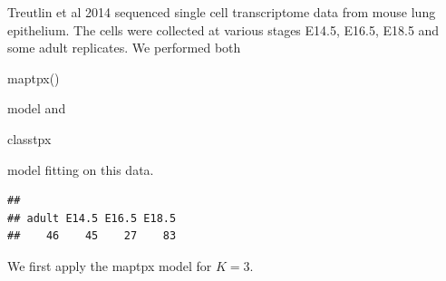 \documentclass[12pt]{article}
\begin{document}
Treutlin et al 2014 sequenced single cell transcriptome data from mouse lung epithelium. The cells were collected at various stages E14.5, E16.5, E18.5 and some adult replicates. We performed both \begin{verb} maptpx() \end{verb} model and \begin{verb} classtpx \end{verb} model fitting on this data.

\begin{knitrout}
\color{fgcolor}\begin{kframe}
\begin{alltt}
\hlopt{::}\hlstd{(}\hlstd{,} \hlstd{=}\hlstd{)}
\end{alltt}
\end{kframe}
\end{knitrout}

\begin{knitrout}
\color{fgcolor}\begin{kframe}
\begin{alltt}
\hlstd{(}\hlstd{)}
 \hlkwb{<-} \hlopt{::}

 \hlkwb{<-} \hlopt{::}
 \hlkwb{<-} 
\hlstd{(pheno_metadata[,}\hlstd{])}
\end{alltt}
\begin{verbatim}
## 
## adult E14.5 E16.5 E18.5 
##    46    45    27    83
\end{verbatim}
\end{kframe}
\end{knitrout}

We first apply the maptpx model for $K=3$.

\begin{knitrout}
\color{fgcolor}\begin{kframe}
\begin{alltt}
 \hlkwb{<-} \hlopt{::} \hlstd{,} \hlstd{=}\hlstd{);}
 \hlstd{=}\hlstd{)}
\end{alltt}
\end{kframe}
\end{knitrout}
\end{document}
